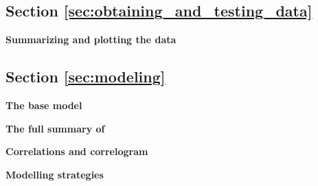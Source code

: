 \subsection{Section \ref{sec:obtaining_and_testing_data}}

\begin{exercise}
\label{ex:summarizing_and_plotting}

\textbf{Summarizing and plotting the data}










\end{exercise}

\subsection{Section \ref{sec:modeling}}

\begin{exercise}
\label{ex:modelling_mod0}

\textbf{The base model} 



\end{exercise}

\begin{exercise}
\label{ex:summary.mod.0}

\textbf{The full summary of }



\end{exercise}


\begin{exercise}
\label{ex:correlogram}

\textbf{Correlations and correlogram}




\end{exercise}

\begin{exercise}
\label{ex:modelling strategies}

\textbf{Modelling strategies}






\end{exercise}

